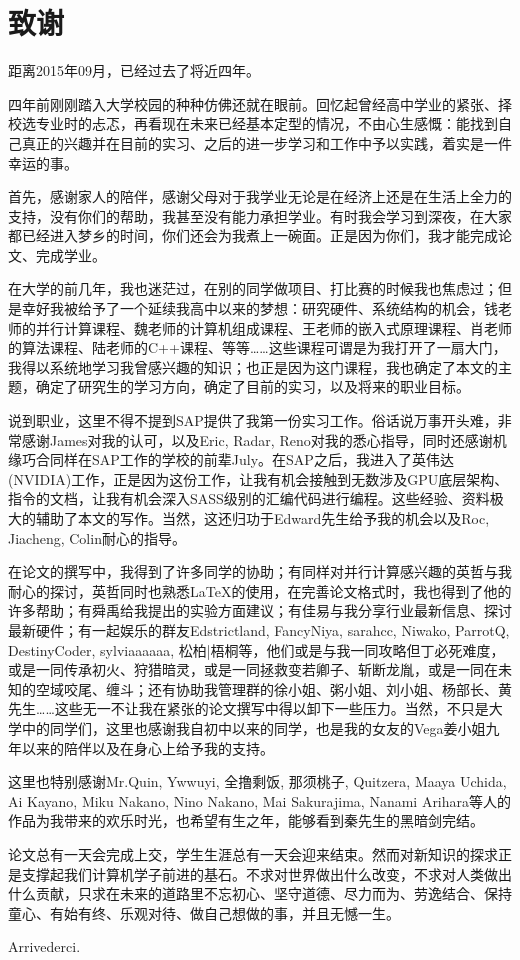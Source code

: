 \clearpage                              %
\section*{致谢}                         %
\par 距离2015年09月，已经过去了将近四年。
\par 四年前刚刚踏入大学校园的种种仿佛还就在眼前。回忆起曾经高中学业的紧张、择校选专业时的忐忑，再看现在未来已经基本定型的情况，不由心生感慨：能找到自己真正的兴趣并在目前的实习、之后的进一步学习和工作中予以实践，着实是一件幸运的事。
\par 首先，感谢家人的陪伴，感谢父母对于我学业无论是在经济上还是在生活上全力的支持，没有你们的帮助，我甚至没有能力承担学业。有时我会学习到深夜，在大家都已经进入梦乡的时间，你们还会为我煮上一碗面。正是因为你们，我才能完成论文、完成学业。
\par 在大学的前几年，我也迷茫过，在别的同学做项目、打比赛的时候我也焦虑过；但是幸好我被给予了一个延续我高中以来的梦想：研究硬件、系统结构的机会，钱老师的并行计算课程、魏老师的计算机组成课程、王老师的嵌入式原理课程、肖老师的算法课程、陆老师的C++课程、等等……这些课程可谓是为我打开了一扇大门，我得以系统地学习我曾感兴趣的知识；也正是因为这门课程，我也确定了本文的主题，确定了研究生的学习方向，确定了目前的实习，以及将来的职业目标。
\par 说到职业，这里不得不提到SAP提供了我第一份实习工作。俗话说万事开头难，非常感谢James对我的认可，以及Eric, Radar, Reno对我的悉心指导，同时还感谢机缘巧合同样在SAP工作的学校的前辈July。在SAP之后，我进入了英伟达(NVIDIA)工作，正是因为这份工作，让我有机会接触到无数涉及GPU底层架构、指令的文档，让我有机会深入SASS级别的汇编代码进行编程。这些经验、资料极大的辅助了本文的写作。当然，这还归功于Edward先生给予我的机会以及Roc, Jiacheng, Colin耐心的指导。
\par 在论文的撰写中，我得到了许多同学的协助；有同样对并行计算感兴趣的英哲与我耐心的探讨，英哲同时也熟悉\LaTeX 的使用，在完善论文格式时，我也得到了他的许多帮助；有舜禹给我提出的实验方面建议；有佳易与我分享行业最新信息、探讨最新硬件；有一起娱乐的群友Edstrictland, FancyNiya, sarahcc, Niwako, ParrotQ, DestinyCoder, sylviaaaaaa, 松柏|梧桐等，他们或是与我一同攻略但丁必死难度，或是一同传承初火、狩猎暗灵，或是一同拯救变若卿子、斩断龙胤，或是一同在未知的空域咬尾、缠斗；还有协助我管理群的徐小姐、粥小姐、刘小姐、杨部长、黄先生……这些无一不让我在紧张的论文撰写中得以卸下一些压力。当然，不只是大学中的同学们，这里也感谢我自初中以来的同学，也是我的女友的Vega姜小姐九年以来的陪伴以及在身心上给予我的支持。
\par 这里也特别感谢Mr.Quin, Ywwuyi, 全撸剩饭, 那须桃子, Quitzera, Maaya Uchida, Ai Kayano, Miku Nakano, Nino Nakano, Mai Sakurajima, Nanami Arihara等人的作品为我带来的欢乐时光，也希望有生之年，能够看到秦先生的黑暗剑完结。
\par 论文总有一天会完成上交，学生生涯总有一天会迎来结束。然而对新知识的探求正是支撑起我们计算机学子前进的基石。不求对世界做出什么改变，不求对人类做出什么贡献，只求在未来的道路里不忘初心、坚守道德、尽力而为、劳逸结合、保持童心、有始有终、乐观对待、做自己想做的事，并且无憾一生。
\par Arrivederci.
